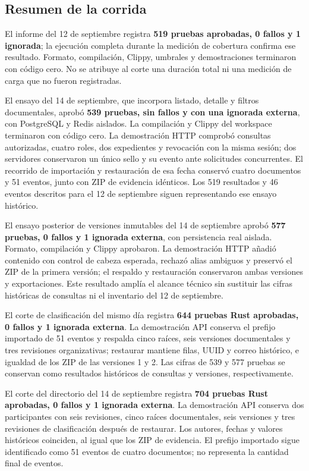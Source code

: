 \subsection{Resumen de la corrida}\label{sec:matriz-corrida}

El informe del 12 de septiembre registra \textbf{519 pruebas aprobadas, 0 fallos y 1 ignorada}; la ejecución completa durante la medición de cobertura confirma ese resultado. Formato, compilación, Clippy, umbrales y demostraciones terminaron con código cero. No se atribuye al corte una duración total ni una medición de carga que no fueron registradas.

El ensayo del 14 de septiembre, que incorpora listado, detalle y filtros documentales, aprobó \textbf{539 pruebas, sin fallos y con una ignorada externa}, con PostgreSQL y Redis aislados. La compilación y Clippy del workspace terminaron con código cero. La demostración HTTP comprobó consultas autorizadas, cuatro roles, dos expedientes y revocación con la misma sesión; dos servidores conservaron un único sello y su evento ante solicitudes concurrentes. El recorrido de importación y restauración de esa fecha conservó cuatro documentos y 51 eventos, junto con ZIP de evidencia idénticos. Los 519 resultados y 46 eventos descritos para el 12 de septiembre siguen representando ese ensayo histórico.

El ensayo posterior de versiones inmutables del 14 de septiembre aprobó \textbf{577 pruebas, 0 fallos y 1 ignorada externa}, con persistencia real aislada. Formato, compilación y Clippy aprobaron. La demostración HTTP añadió contenido con control de cabeza esperada, rechazó alias ambiguos y preservó el ZIP de la primera versión; el respaldo y restauración conservaron ambas versiones y exportaciones. Este resultado amplía el alcance técnico sin sustituir las cifras históricas de consultas ni el inventario del 12 de septiembre.

El corte de clasificación del mismo día registra \textbf{644 pruebas Rust aprobadas, 0 fallos y 1 ignorada externa}. La demostración API conserva el prefijo importado de 51 eventos y respalda cinco raíces, seis versiones documentales y tres revisiones organizativas; restaurar mantiene filas, UUID y correo histórico, e igualdad de los ZIP de las versiones 1 y 2. Las cifras de 539 y 577 pruebas se conservan como resultados históricos de consultas y versiones, respectivamente.

El corte del directorio del 14 de septiembre registra \textbf{704 pruebas Rust aprobadas, 0 fallos y 1 ignorada externa}. La demostración API conserva dos participantes con seis revisiones, cinco raíces documentales, seis versiones y tres revisiones de clasificación después de restaurar. Los autores, fechas y valores históricos coinciden, al igual que los ZIP de evidencia. El prefijo importado sigue identificado como 51 eventos de cuatro documentos; no representa la cantidad final de eventos.

